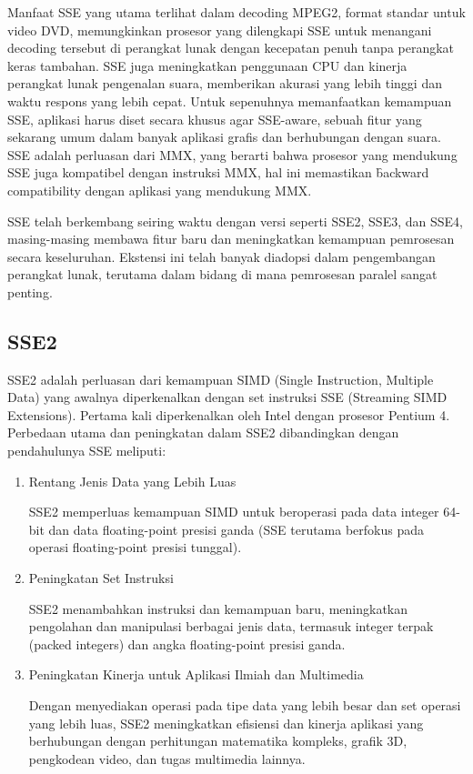 Manfaat SSE yang utama terlihat dalam decoding MPEG2, format standar untuk video DVD, memungkinkan prosesor yang dilengkapi SSE untuk menangani decoding tersebut di perangkat lunak dengan kecepatan penuh tanpa perangkat keras tambahan. SSE juga meningkatkan penggunaan CPU dan kinerja perangkat lunak pengenalan suara, memberikan akurasi yang lebih tinggi dan waktu respons yang lebih cepat. Untuk sepenuhnya memanfaatkan kemampuan SSE, aplikasi harus diset secara khusus agar SSE-aware, sebuah fitur yang sekarang umum dalam banyak aplikasi grafis dan berhubungan dengan suara. SSE adalah perluasan dari MMX, yang berarti bahwa prosesor yang mendukung SSE juga kompatibel dengan instruksi MMX, hal ini memastikan \f{backward compatibility} dengan aplikasi yang mendukung MMX\cite{informitStreamingSIMD}.

SSE telah berkembang seiring waktu dengan versi seperti SSE2, SSE3, dan SSE4, masing-masing membawa fitur baru dan meningkatkan kemampuan pemrosesan secara keseluruhan. Ekstensi ini telah banyak diadopsi dalam pengembangan perangkat lunak, terutama dalam bidang di mana pemrosesan paralel sangat penting.

\subsection{SSE2}
SSE2 adalah perluasan dari kemampuan SIMD (Single Instruction, Multiple Data) yang awalnya diperkenalkan dengan set instruksi SSE (Streaming SIMD Extensions). Pertama kali diperkenalkan oleh Intel dengan prosesor Pentium 4\cite{SystemVAppBinaryInterfaceMichael}. Perbedaan utama dan peningkatan dalam SSE2 dibandingkan dengan pendahulunya SSE meliputi:

\begin{enumerate}
	\item Rentang Jenis Data yang Lebih Luas 
	
	SSE2 memperluas kemampuan SIMD untuk beroperasi pada data integer 64-bit dan data floating-point presisi ganda (SSE terutama berfokus pada operasi floating-point presisi tunggal).
	
	\item Peningkatan Set Instruksi
	
	SSE2 menambahkan instruksi dan kemampuan baru, meningkatkan pengolahan dan manipulasi berbagai jenis data, termasuk integer terpak (packed integers) dan angka floating-point presisi ganda.
	
	\item Peningkatan Kinerja untuk Aplikasi Ilmiah dan Multimedia
	
	Dengan menyediakan operasi pada tipe data yang lebih besar dan set operasi yang lebih luas, SSE2 meningkatkan efisiensi dan kinerja aplikasi yang berhubungan dengan perhitungan matematika kompleks, grafik 3D, pengkodean video, dan tugas multimedia lainnya.
\end{enumerate}

